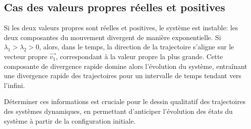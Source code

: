         \subsection{Cas des valeurs propres réelles et positives}
            Si les deux valeurs propres sont réelles et positives, le système est instable: les deux composantes du mouvement divergent de manière exponentielle. Si $\lambda_1 > \lambda_2 > 0$, alors, dans le temps, la direction de la trajectoire s’aligne sur le vecteur propre $\overrightarrow{v_1}$, correspondant à la valeur propre la plus grande. Cette composante de divergence rapide domine alors l'évolution du système, entraînant une divergence rapide des trajectoires pour un intervalle de temps tendant vers l'infini.
            
            Déterminer ces informations est cruciale pour le dessin qualitatif des trajectoires des systèmes dynamiques, en permettant d'anticiper l'évolution des états du système à partir de la configuration initiale.
            
